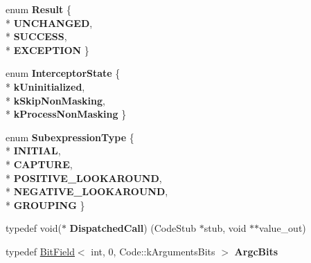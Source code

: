 \begin{DoxyCompactItemize}
\item 
enum {\bfseries Result} \{ \\*
{\bfseries U\+N\+C\+H\+A\+N\+G\+ED}, 
\\*
{\bfseries S\+U\+C\+C\+E\+SS}, 
\\*
{\bfseries E\+X\+C\+E\+P\+T\+I\+ON}
 \}\hypertarget{classv8_1_1internal_1_1_b_a_s_e___e_m_b_e_d_d_e_d_ae7714c1bab7d34f7ed48a8c2a9446004}{}\label{classv8_1_1internal_1_1_b_a_s_e___e_m_b_e_d_d_e_d_ae7714c1bab7d34f7ed48a8c2a9446004}

\item 
enum {\bfseries Interceptor\+State} \{ \\*
{\bfseries k\+Uninitialized}, 
\\*
{\bfseries k\+Skip\+Non\+Masking}, 
\\*
{\bfseries k\+Process\+Non\+Masking}
 \}\hypertarget{classv8_1_1internal_1_1_b_a_s_e___e_m_b_e_d_d_e_d_a10981990d459bdfb231c070a7b8e8324}{}\label{classv8_1_1internal_1_1_b_a_s_e___e_m_b_e_d_d_e_d_a10981990d459bdfb231c070a7b8e8324}

\item 
enum {\bfseries Subexpression\+Type} \{ \\*
{\bfseries I\+N\+I\+T\+I\+AL}, 
\\*
{\bfseries C\+A\+P\+T\+U\+RE}, 
\\*
{\bfseries P\+O\+S\+I\+T\+I\+V\+E\+\_\+\+L\+O\+O\+K\+A\+R\+O\+U\+ND}, 
\\*
{\bfseries N\+E\+G\+A\+T\+I\+V\+E\+\_\+\+L\+O\+O\+K\+A\+R\+O\+U\+ND}, 
\\*
{\bfseries G\+R\+O\+U\+P\+I\+NG}
 \}\hypertarget{classv8_1_1internal_1_1_b_a_s_e___e_m_b_e_d_d_e_d_adec7fb2d6bc95679a9bec990e43aef94}{}\label{classv8_1_1internal_1_1_b_a_s_e___e_m_b_e_d_d_e_d_adec7fb2d6bc95679a9bec990e43aef94}

\item 
typedef void($\ast$ {\bfseries Dispatched\+Call}) (Code\+Stub $\ast$stub, void $\ast$$\ast$value\+\_\+out)\hypertarget{classv8_1_1internal_1_1_b_a_s_e___e_m_b_e_d_d_e_d_a3ff599e466d147ae70da16c8e8c66e29}{}\label{classv8_1_1internal_1_1_b_a_s_e___e_m_b_e_d_d_e_d_a3ff599e466d147ae70da16c8e8c66e29}

\item 
typedef \hyperlink{classv8_1_1internal_1_1_bit_field}{Bit\+Field}$<$ int, 0, Code\+::k\+Arguments\+Bits $>$ {\bfseries Argc\+Bits}\hypertarget{classv8_1_1internal_1_1_b_a_s_e___e_m_b_e_d_d_e_d_a090c1858800c99dc0d76606a2871f4df}{}\label{classv8_1_1internal_1_1_b_a_s_e___e_m_b_e_d_d_e_d_a090c1858800c99dc0d76606a2871f4df}


\end{DoxyCompactItemize}
